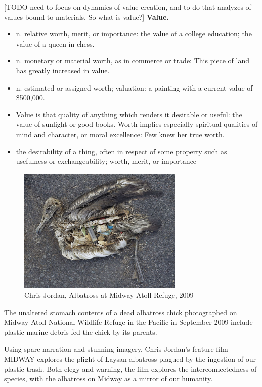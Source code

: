[TODO need to focus on dynamics of value creation, and to do that analyzes of values bound to materials. So what is value?]
\textbf{Value.}
\begin{itemize}
\item n. relative worth, merit, or importance: the value of a college education; the value of a queen in chess.
\item n. monetary or material worth, as in commerce or trade: This piece of land has greatly increased in value.
\item n. estimated or assigned worth; valuation: a painting with a current value of \$500,000.
\item Value is that quality of anything which renders it desirable or useful: the value of sunlight or good books. Worth implies especially spiritual qualities of mind and character, or moral excellence: Few knew her true worth.
\item the desirability of a thing, often in respect of some property such as usefulness or exchangeability; worth, merit, or importance
\end{itemize}






\begin{figure}[h!]
  \centering
  \includegraphics[height=6cm]{graphics/ChrisJordan-Albatross.jpg}
  \caption{Chris Jordan, Albatross at Midway Atoll Refuge, 2009}
  \label{fig:ChrisJordan_Albatross}
\end{figure}

The unaltered stomach contents of a dead albatross chick photographed on Midway Atoll National Wildlife Refuge in the Pacific in September 2009 include plastic marine debris fed the chick by its parents.

Using spare narration and stunning imagery, Chris Jordan's feature film MIDWAY explores the plight of Laysan albatross plagued by the ingestion of our plastic trash. Both elegy and warning, the film explores the interconnectedness of species, with the albatross on Midway as a mirror of our humanity.

